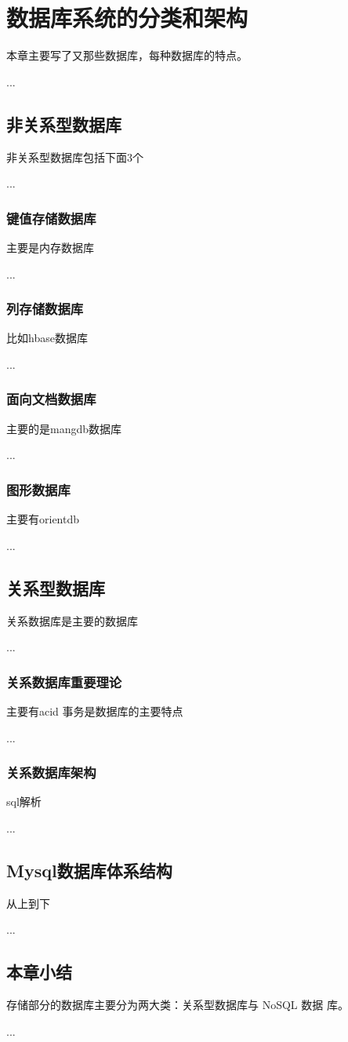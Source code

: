 
\chapter{数据库系统的分类和架构}
本章主要写了又那些数据库，每种数据库的特点。

...
\section{非关系型数据库}
非关系型数据库包括下面3个

...
\subsection{键值存储数据库}
主要是内存数据库

...
\subsection{列存储数据库}
比如hbase数据库

...
\subsection{面向文档数据库}
主要的是mangdb数据库

...
\subsection{图形数据库}
主要有orientdb

...
\section{关系型数据库}
关系数据库是主要的数据库

...
\subsection{关系数据库重要理论}
主要有acid
事务是数据库的主要特点

...
\subsection{关系数据库架构}
sql解析

...
\section{Mysql数据库体系结构}
从上到下

...
\section{本章小结}
存储部分的数据库主要分为两大类：关系型数据库与 NoSQL 数据
库。

...